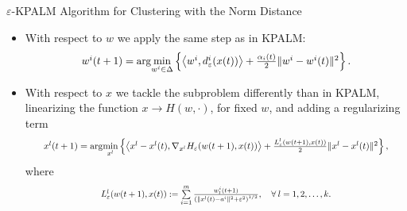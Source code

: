 \documentclass[9pt,handout]{beamer} %
\begin{document}
	\begin{frame}{$\varepsilon$-KPALM Algorithm for Clustering with the Norm Distance}
		\begin{itemize}[<+->]
			\item With respect to $w$ we apply the same step as in KPALM:
			\begin{equation*}
				\resizebox{.7\hsize}{!}{$w^i(t+1) = \arg\!\min\limits_{w^i \in \Delta} \left\lbrace \left\langle w^i, d^i_{\varepsilon}(x(t)) \right\rangle + \frac{\alpha_i(t)}{2} \|w^i -w^i(t)\|^2 \right\rbrace.$}		
			\end{equation*}
			\item With respect to $x$ we tackle the subproblem differently than in KPALM, linearizing the function $x \rightarrow H(w,\cdot)$, for fixed $w$, and adding a regularizing term
			\begin{equation*}
				\resizebox{.9\textwidth}{!}{$x^l(t+1) = \arg\!\min\limits_{x^l} \left\lbrace \left\langle x^l - x^l(t) , \nabla_{x^l}H_{\varepsilon}(w(t+1),x(t)) \right\rangle + \frac{L^l_{\varepsilon}(w(t+1),x(t))}{2} \|x^l - x^l(t)\|^2 \right\rbrace,$}
			\end{equation*}
			where
			\begin{equation*}
				\resizebox{.6\hsize}{!}{$L^l_{\varepsilon}(w(t+1),x(t)) := \sum\limits_{i=1}^{m} \frac{w^i_l(t+1)}{\left( \|x^l(t)-a^i\|^2 + {\varepsilon}^2 \right)^{1/2}}, \quad \forall \: l=1,2, \ldots, k.$}
			\end{equation*}
			\end{itemize}
			\pause
			\begin{center}
       		\end{center}
	\end{frame}
	
\end{document}
